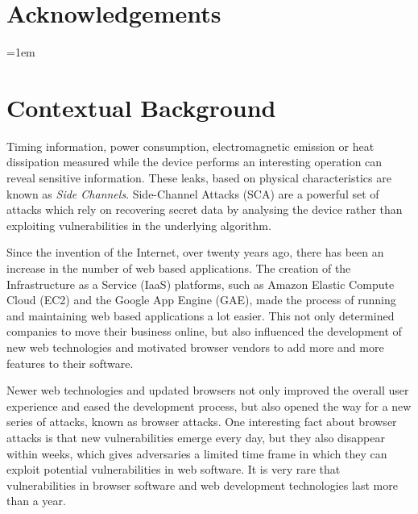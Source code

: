 \documentclass[10pt,a4paper,twoside]{book}
\begin{document}

\chapter*{Acknowledgements}

\noindent


\cleardoublepage
\pagestyle{marked}
\parindent=0in
\parskip=1em 



\chapter{Contextual Background}
\label{chap:context}

Timing information, power consumption, electromagnetic emission or heat dissipation measured while the device performs an interesting operation can reveal sensitive information. These leaks, based on physical characteristics are known as \textit{Side Channels}. Side-Channel Attacks (SCA) are a powerful set of attacks which rely on recovering secret data by analysing the device rather than exploiting vulnerabilities in the underlying algorithm. 

Since the invention of the Internet, over twenty years ago, there has been an increase in the number of web based applications. The creation of the Infrastructure as a Service (IaaS) platforms, such as Amazon Elastic Compute Cloud (EC2) and the Google App Engine (GAE), made the process of running and maintaining web based applications a lot easier. This not only determined companies to move their business online, but also influenced the development of new web technologies and motivated browser vendors to add more and more features to their software. 

Newer web technologies and updated browsers not only improved the overall user experience and eased the development process, but also opened the way for a new series of attacks, known as browser attacks. One interesting fact about browser attacks is that new vulnerabilities emerge every day, but they also disappear within weeks, which gives adversaries a limited time frame in which they can exploit potential vulnerabilities in web software. It is very rare that vulnerabilities in browser software and web development technologies last more than a year.
\end{document}
